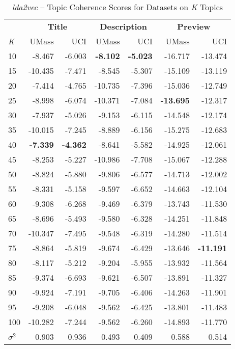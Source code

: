 \documentclass[letterpaper,12pt]{article}
\begin{document}
\begin{table}
	\caption{\label{tab:lda2vec_data_comp} \emph{lda2vec} -- Topic Coherence Scores for Datasets on \emph{K} Topics}
	\begin{center}
		\begin{tabular}{| l | rr | rr | rr |}
			\hline
			{} & \multicolumn{2}{c|}{\textbf{Title}} & \multicolumn{2}{c|}{\textbf{Description}} & \multicolumn{2}{c|}{\textbf{Preview}} \\
			\emph{K} &       UMass &    UCI &  UMass &    UCI &   UMass &    UCI \\
			\hline
			10  &  -8.467 & -6.003 &      \textbf{-8.102} & \textbf{-5.023} & -16.717 & -13.474 \\
			15  & -10.435 & -7.471 &      -8.545 & -5.307 & -15.109 & -13.119 \\
			20  &  -7.414 & -4.765 &     -10.735 & -7.396 & -15.036 & -12.749 \\
			25  &  -8.998 & -6.074 &     -10.371 & -7.084 & \textbf{-13.695} & -12.317 \\
			30  &  -7.937 & -5.026 &      -9.153 & -6.115 & -14.548 & -12.174 \\
			35  & -10.015 & -7.245 &      -8.889 & -6.156 & -15.275 & -12.683 \\
			40  &  \textbf{-7.339} & \textbf{-4.362} &      -8.641 & -5.582 & -14.925 & -12.061 \\
			45  &  -8.253 & -5.227 &     -10.986 & -7.708 & -15.067 & -12.288 \\
			50  &  -8.824 & -5.880 &      -9.806 & -6.577 & -14.713 & -12.002 \\
			55  &  -8.331 & -5.158 &      -9.597 & -6.652 & -14.663 & -12.104 \\
			60  &  -9.308 & -6.268 &      -9.469 & -6.379 & -13.743 & -11.530 \\
			65  &  -8.696 & -5.493 &      -9.580 & -6.328 & -14.251 & -11.848 \\
			70  & -10.347 & -7.495 &      -9.548 & -6.319 & -14.280 & -11.514 \\
			75  &  -8.864 & -5.819 &      -9.674 & -6.429 & -13.646 & \textbf{-11.191} \\
			80  &  -8.117 & -5.212 &      -9.204 & -5.955 & -13.932 & -11.564 \\
			85  &  -9.374 & -6.693 &      -9.621 & -6.507 & -13.891 & -11.327 \\
			90  &  -9.924 & -7.191 &      -9.705 & -6.406 & -14.263 & -11.901 \\
			95  &  -9.208 & -6.048 &      -9.562 & -6.425 & -13.801 & -11.483 \\
			100 & -10.282 & -7.244 &      -9.562 & -6.260 & -14.893 & -11.770 \\
			\hline
			$\sigma^2$ & 0.903 & 0.936 & 0.493 & 0.409 & 0.588 & 0.514 \\
			\hline
			\end{tabular}
	\end{center}
\end{table}
\newpage
\end{document}

